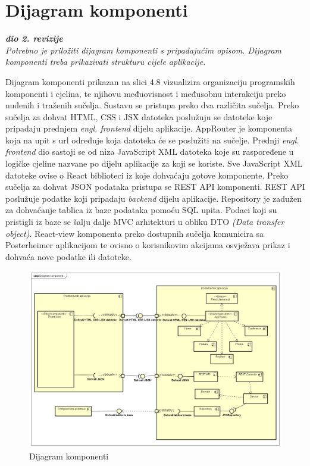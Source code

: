 			\eject
		\section{Dijagram komponenti}
		
			\textbf{\textit{dio 2. revizije}}\\
		
			 \textit{Potrebno je priložiti dijagram komponenti s pripadajućim opisom. Dijagram komponenti treba prikazivati strukturu cijele aplikacije.}
			 
			 \indent Dijagram komponenti prikazan na slici 4.8 vizualizira organizaciju programskih komponenti i cjelina, te njihovu međuovisnost i međusobnu interakciju preko nuđenih i traženih sučelja. Sustavu se pristupa preko dva različita sučelja. Preko sučelja za dohvat HTML, CSS i JSX datoteka poslužuju se datoteke koje pripadaju prednjem \textit{engl. frontend} dijelu aplikacije. AppRouter je komponenta koja na upit s url određuje koja datoteka će se poslužiti na sučelje. Prednji \textit{engl. frontend} dio sastoji se od niza JavaScript XML datoteka koje su raspoređene u logičke cjeline nazvane po dijelu aplikacije za koji se koriste. Sve JavaScript XML datoteke ovise o React biblioteci iz koje dohvaćaju gotove komponente. Preko sučelja za dohvat JSON podataka pristupa se REST API komponenti. REST API poslužuje podatke koji pripadaju \textit{backend} dijelu aplikacije. Repository je zadužen za dohvaćanje tablica iz baze podataka pomoću SQL upita. Podaci koji su pristigli iz baze se šalju dalje MVC arhitekturi u obliku DTO \textit{(Data transfer object)}. React-view komponenta preko dostupnih sučelja komunicira sa Posterheimer aplikacijom te ovisno o korisnikovim akcijama osvježava prikaz i dohvaća nove podatke ili datoteke.
			 
			 \begin{figure}
			 	\includegraphics[width=\linewidth]{Slike/ComponentDiagram}
			 	\caption{Dijagram komponenti}
			 \end{figure}